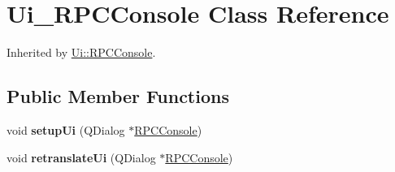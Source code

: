 \hypertarget{class_ui___r_p_c_console}{}\section{Ui\+\_\+\+R\+P\+C\+Console Class Reference}
\label{class_ui___r_p_c_console}


Inherited by \mbox{\hyperlink{class_ui_1_1_r_p_c_console}{Ui\+::\+R\+P\+C\+Console}}.

\subsection*{Public Member Functions}
\begin{DoxyCompactItemize}
\item 
\mbox{\label{class_ui___r_p_c_console_a07d3a25190f5cad02fa8782b7f58e7d3}} 
void {\bfseries setup\+Ui} (Q\+Dialog $\ast$\mbox{\hyperlink{class_r_p_c_console}{R\+P\+C\+Console}})
\item 
\mbox{\label{class_ui___r_p_c_console_ac6303c05e86e53b9f14c8b6d29deb4f5}} 
void {\bfseries retranslate\+Ui} (Q\+Dialog $\ast$\mbox{\hyperlink{class_r_p_c_console}{R\+P\+C\+Console}})
\end{DoxyCompactItemize}
